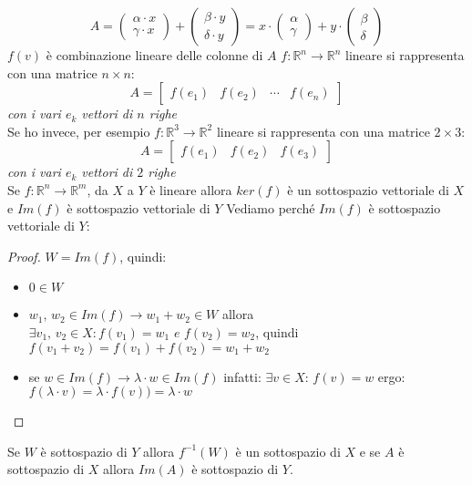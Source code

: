 \documentclass[a4paper,12pt, oneside]{book}
\begin{document}
$$A=
	\left(\begin{matrix}
			\alpha\cdot x \\
			\gamma \cdot x
		\end{matrix}\right)+\left(\begin{matrix}
			\beta\cdot y \\
			\delta \cdot y
		\end{matrix}\right)=
	x\cdot\left(\begin{matrix}
			\alpha \\
			\gamma
		\end{matrix}\right)+
	y\cdot\left(\begin{matrix}
			\beta \\
			\delta
		\end{matrix}\right)
$$
$f(v)$ è combinazione lineare delle colonne di $A$
$f:\mathbb{R}^n\to \mathbb{R}^n$ lineare si rappresenta con una matrice $n\times n$:
$$
	A=\left[\begin{matrix}
			f(e_1) & f(e_2) & \cdots & f(e_n)
		\end{matrix}\right]
$$
\textit{con i vari $e_k$ vettori di $n$ righe}\\
Se ho invece, per esempio $f:\mathbb{R}^3\to \mathbb{R}^2$ lineare si rappresenta con una matrice $2\times 3$:
$$
	A=\left[\begin{matrix}
			f(e_1) & f(e_2) & f(e_3)
		\end{matrix}\right]
$$
\textit{con i vari $e_k$ vettori di $2$ righe}\\
\newpage
Se $f:\mathbb{R}^n\rightarrow \mathbb{R}^m$, da $X$ a $Y$ è lineare allora $ker(f)$ è un sottospazio vettoriale di $X$ e $Im(f)$ è sottospazio vettoriale di $Y$
Vediamo perché $Im(f)$ è sottospazio vettoriale di $Y$:\\
\begin{proof}
	$W=Im(f)$, quindi:
	\begin{itemize}
		\item $0\in W$
		\item $w_1,\,w_2\in Im(f)\rightarrow w_1+w_2\in W$ allora $\exists v_1,\, v_2\in X: f(v_1)=w_1 \,\, e \,\, f(v_2)=w_2$, quindi $f(v_1+v_2)=f(v_1)+f(v_2)=w_1+w_2$
		\item se $w\in Im(f)\rightarrow \lambda\cdot w\in Im(f)$ infatti: $\exists v\in X:\, f(v)=w$ ergo: $f(\lambda\cdot v)=\lambda\cdot f(v))=\lambda\cdot w$
	\end{itemize}
\end{proof}
Se $W$ è sottospazio di $Y$ allora $f^{-1}(W)$ è un sottospazio di $X$ e se $A$ è sottospazio di $X$ allora $Im(A)$ è sottospazio di $Y$.\\
\end{document}
